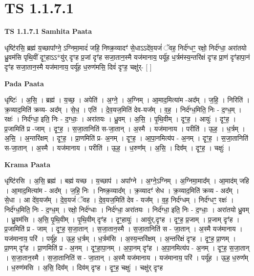 \documentclass[17pt]{extarticle}
\begin{document}
\section{ TS 1.1.7.1 }

\textbf{TS 1.1.7.1 } \newline
\textbf{Samhita Paata} \newline

धृष्टि॑रसि॒ ब्रह्म॑ य॒च्छापा᳚ग्ने॒ ऽग्निमा॒मादं॑ जहि॒ निष्क्र॒व्यादꣳ॑ से॒धाऽऽदे॑व॒यजं॑ ॅवह॒ निर्द॑ग्धꣳ॒॒ रक्षो॒ निर्द॑ग्धा॒ अरा॑तयो ध्रु॒वम॑सि पृथि॒वीं दृꣳ॒॒हाऽऽ*यु॑र् दृꣳह प्र॒जां दृꣳ॑ह सजा॒तान॒स्मै यज॑मानाय॒ पर्यू॑ह ध॒र्त्रम॑स्य॒न्तरि॑क्षं दृꣳह प्रा॒णं दृꣳ॑हापा॒नं दृꣳ॑ह सजा॒तान॒स्मै यज॑मानाय॒ पर्यू॑ह ध॒रुण॑मसि॒ दिवं॑ दृꣳह॒ चक्षु॑र्- [ ] \newline

\textbf{Pada Paata} \newline

धृष्टिः॑ । अ॒सि॒ । ब्रह्म॑ । य॒च्छ॒ । अपेति॑ । अ॒ग्ने॒ । अ॒ग्निम् । आ॒माद॒मित्या॑म -अद᳚म् । ज॒हि॒ । निरिति॑ । क्र॒व्याद॒मिति॑ क्रव्य- अद᳚म् । से॒ध॒ । एति॑ । दे॒व॒यज॒मिति॑ देव-यज᳚म् । व॒ह॒ । निर्द॑ग्ध॒मिति॒ निः - द॒ग्ध॒म् । रक्षः॑ । निर्द॑ग्धा॒ इति॒ निः - द॒ग्धाः॒ । अरा॑तयः । ध्रु॒वम् । अ॒सि॒ । पृ॒थि॒वीम् । दृꣳ॒॒ह॒ । आयुः॑ । दृꣳ॒॒ह॒ । प्र॒जामिति॑ प्र -जाम् । दृꣳ॒॒ह॒ । स॒जा॒तानिति॑ स-जा॒तान् । अ॒स्मै । यज॑मानाय । परीति॑ । ऊ॒ह॒ । ध॒र्त्रम् । अ॒सि॒ । अ॒न्तरि॑क्षम् । दृꣳ॒॒ह॒ । प्रा॒णमिति॑ प्र- अ॒नम् । दृꣳ॒॒ह॒ । आ॒पा॒नमित्य॑प - अ॒नम् । दृꣳ॒॒ह॒ । स॒जा॒तानिति॑ स-जा॒तान् । अ॒स्मै । यज॑मानाय । परीति॑ । ऊ॒ह॒ । ध॒रुण᳚म् । अ॒सि॒ । दिव᳚म् । दृꣳ॒॒ह॒ । चक्षुः॑ ।  \newline


\textbf{Krama Paata} \newline

धृष्टि॑रसि । अ॒सि॒ ब्रह्म॑ । बह्म॑ यच्छ । य॒च्छाप॑ । अपा᳚ग्ने । अ॒ग्ने॒ऽग्निम् । अ॒ग्निमा॒माद᳚म् । आ॒माद॑म् जहि । आ॒माद॒मित्या॑म - अद᳚म् । ज॒हि॒ निः । निष्क्र॒व्याद᳚म् । क्र॒व्यादꣳ॑ सेध । क्र॒व्याद॒मिति॑ क्रव्य - अद᳚म् । से॒धा । आ दे॑व॒यज᳚म् । दे॒व॒यजं॑ ॅवह । दे॒व॒यज॒मिति॑ देव - यज᳚म् । व॒ह॒ निर्द॑ग्धम् । निर्द॑ग्धꣳ॒॒ रक्षः॑ । निर्द॑ग्ध॒मिति॒ निः - द॒ग्ध॒म् । रक्षो॒ निर्द॑ग्धाः । निर्द॑ग्धा॒ अरा॑तयः । निर्द॑ग्धा॒ इति॒ निः - द॒ग्धाः॒ । अरा॑तयो ध्रु॒वम् । ध्रु॒वम॑सि । अ॒सि॒ पृ॒थि॒वीम् । पृ॒थि॒वीम् दृꣳ॑ह । दृꣳ॒॒हायुः॑ । आयु॑र्,दृꣳह । दृꣳ॒॒ह॒ प्र॒जाम् । प्र॒जाम् दृꣳ॑ह । प्र॒जामिति॑ प्र - जाम् । दृꣳ॒॒ह॒ स॒जा॒तान् । स॒जा॒तान॒स्मै । स॒जा॒तानिति॑ स - जा॒तान् । अ॒स्मै यज॑मानाय । यज॑मानाय॒ परि॑ । पर्यू॑ह । ऊ॒ह॒ ध॒र्त्रम् । ध॒र्त्रम॑सि । अ॒स्य॒न्तरि॑क्षम् । अ॒न्तरि॑क्षं दृꣳह । दृꣳ॒॒ह॒ प्रा॒णम् । प्रा॒णम् दृꣳ॑ह । प्रा॒णमिति॑ प्र - अ॒नम् । दृꣳ॒॒हा॒पा॒नम् । अ॒पा॒नम् दृꣳ॑ह । अ॒पा॒नमित्य॑प - अ॒नम् । दृꣳ॒॒ह॒ स॒जा॒तान् । स॒जा॒तान॒स्मै । स॒जा॒तानिति॑ स - जा॒तान् । अ॒स्मै यज॑मानाय । यज॑मानाय॒ परि॑ । पर्यू॑ह । ऊ॒ह॒ ध॒रुण᳚म् । ध॒रुण॑मसि । अ॒सि॒ दिव᳚म् । दिव॑म् दृꣳह । दृꣳ॒॒ह॒ चक्षुः॑ । चक्षु॑र् दृꣳह \newline
\end{document}
